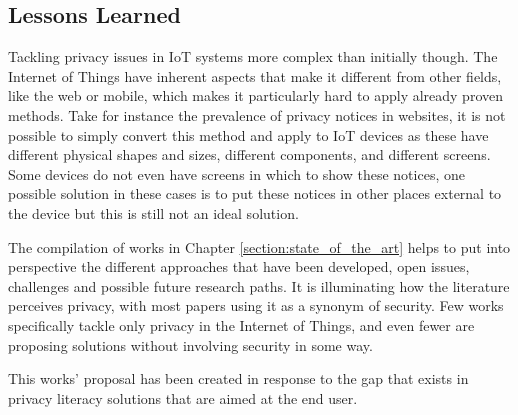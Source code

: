\subsection{Lessons Learned}

Tackling privacy issues in IoT systems more complex than initially though.
The Internet of Things have inherent aspects that make it different from
other fields, like the web or mobile, which makes it particularly hard
to apply already proven methods. Take for instance the prevalence of
privacy notices in websites, it is not possible to simply convert this
method and apply to IoT devices as these have different physical shapes and sizes,
different components, and different screens. Some devices do not even have screens
in which to show these notices, one possible solution in these cases is to
put these notices in other places external to the device but this is still not
an ideal solution.

The compilation of works in Chapter \ref{section:state_of_the_art} helps
to put into perspective the different approaches that have been developed,
open issues, challenges and possible future research paths. It is illuminating
how the literature perceives privacy, with most papers using it as a synonym of security.
Few works specifically tackle only privacy in the Internet of Things, and even fewer
are proposing solutions without involving security in some way.

This works' proposal has been created in response to the gap that exists
in privacy literacy solutions that are aimed at the end user.
